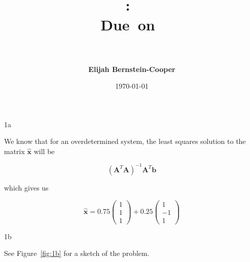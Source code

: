 \documentclass{article}
\title{\vspace{0in}
    \textmd{\textbf{\hmwkClass:\ \hmwkTitle}}\\
    \normalsize\vspace{0.1in}\small{Due\ on\ \hmwkDueDate}\\
    \vspace{0.1in}\large{\textit{\hmwkClassInstructor\ \hmwkClassTime}}
    \vspace{0.5in}}
\author{\textbf{Elijah Bernstein-Cooper}}
\date{\today} %
\begin{document}
\maketitle

\begin{homeworkProblem}

    \begin{homeworkSection}{1a}
        
        We know that for an overdetermined system, the least squares solution
        to the matrix $\bm{\hat{x}}$ will be 

        \begin{equation*}
            {(\bm{A}^T \bm{A})}^{-1}\bm{A}^T\bm{b}
        \end{equation*}

        \noindent which gives us

        \begin{equation*}
            \bm{\hat{x}} = 
                0.75 \left(\begin{matrix} 1 \\ 1 \\ 1 \end{matrix}\right) + 
                0.25 \left(\begin{matrix} 1 \\ -1 \\ 1 \end{matrix}\right)
        \end{equation*}

    \end{homeworkSection}

    \begin{homeworkSection}{1b}
        
        See Figure~\ref{fig:1b} for a sketch of the problem.


\end{homeworkSection}
\end{homeworkProblem}
\end{document}

